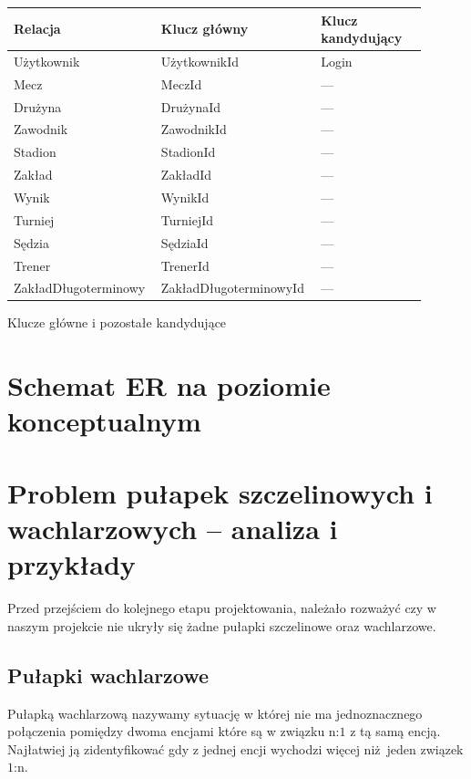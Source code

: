 \documentclass{mwrep}[15pt]
\begin{document}
\vspace{1cm}
\begin{threeparttable}[H]
	\begin{tabular}{|p{0.3\linewidth}|p{0.35\linewidth}|p{0.25\linewidth}|}
	\hline
	Relacja & Klucz główny & Klucz kandydujący \\ \hline
	Użytkownik & UżytkownikId & Login \\ \hline
	Mecz & MeczId & \hfil--- \\ \hline
	Drużyna & DrużynaId & \hfil--- \\ \hline
	Zawodnik & ZawodnikId & \hfil--- \\ \hline
	Stadion & StadionId & \hfil--- \\ \hline
	Zakład & ZakładId & \hfil--- \\ \hline
	Wynik & WynikId & \hfil--- \\ \hline
	Turniej & TurniejId & \hfil--- \\ \hline
	Sędzia & SędziaId & \hfil--- \\ \hline
	Trener & TrenerId & \hfil--- \\ \hline
	ZakładDługoterminowy & ZakładDługoterminowyId & \hfil--- \\ \hline
	\end{tabular}	
	\caption{Klucze główne i pozostałe kandydujące}
\end{threeparttable}
\vspace{1cm}

\section{Schemat ER na poziomie konceptualnym}
\newpage

\section{Problem pułapek szczelinowych i wachlarzowych – analiza i przykłady}
Przed przejściem do kolejnego etapu projektowania, należało rozważyć czy w naszym projekcie
nie ukryły się żadne pułapki szczelinowe oraz wachlarzowe. 


\subsection{Pułapki wachlarzowe}
Pułapką wachlarzową nazywamy sytuację w której nie ma jednoznacznego połączenia pomiędzy dwoma encjami które 
są w związku n:$1$ z tą samą encją. Najłatwiej ją zidentyfikować gdy z jednej encji wychodzi więcej niż jeden związek $1$:n.
\end{document}
